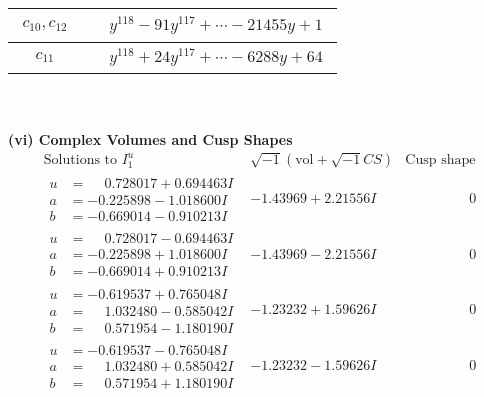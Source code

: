 \documentclass[1p]{elsarticle_modified}
\theoremstyle{definition}
\newcommand{\I}{\sqrt{-1}}
\begin{document}
\begin{tabular}{m{50pt}|m{274pt}}
\hline $$\begin{aligned}c_{10},c_{12}\end{aligned}$$&$\begin{aligned}
&y^{118}-91 y^{117}+\cdots-21455 y+1
\end{aligned}$\\
\hline $$\begin{aligned}c_{11}\end{aligned}$$&$\begin{aligned}
&y^{118}+24 y^{117}+\cdots-6288 y+64
\end{aligned}$\\
\hline
\end{tabular}\\~\\
\newpage\flushleft \textbf{(vi) Complex Volumes and Cusp Shapes}
$$\begin{array}{c|c|c}  
\text{Solutions to }I^u_{1}& \I (\text{vol} + \sqrt{-1}CS) & \text{Cusp shape}\\
 \hline 
\begin{aligned}
u &= \phantom{-}0.728017 + 0.694463 I \\
a &= -0.225898 - 1.018600 I \\
b &= -0.669014 - 0.910213 I\end{aligned}
 & -1.43969 + 2.21556 I & \phantom{-0.000000 } 0 \\ \hline\begin{aligned}
u &= \phantom{-}0.728017 - 0.694463 I \\
a &= -0.225898 + 1.018600 I \\
b &= -0.669014 + 0.910213 I\end{aligned}
 & -1.43969 - 2.21556 I & \phantom{-0.000000 } 0 \\ \hline\begin{aligned}
u &= -0.619537 + 0.765048 I \\
a &= \phantom{-}1.032480 - 0.585042 I \\
b &= \phantom{-}0.571954 - 1.180190 I\end{aligned}
 & -1.23232 + 1.59626 I & \phantom{-0.000000 } 0 \\ \hline\begin{aligned}
u &= -0.619537 - 0.765048 I \\
a &= \phantom{-}1.032480 + 0.585042 I \\
b &= \phantom{-}0.571954 + 1.180190 I\end{aligned}
 & -1.23232 - 1.59626 I & \phantom{-0.000000 } 0 \\ \hline\begin{aligned}

\end{aligned}
\end{array}$$
\end{document}

